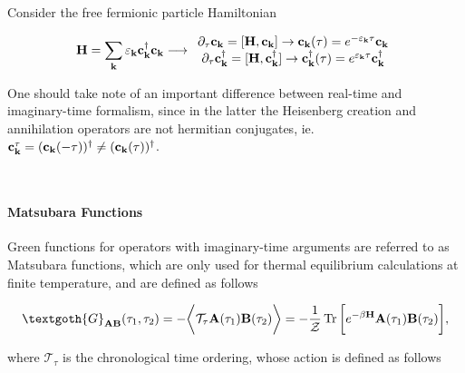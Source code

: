 \begin{tcolorbox}[colback = Bittersweet, title = Example]

Consider the free fermionic particle Hamiltonian

\begin{equation*}
    \begin{split}
        {\bf H} = \sum_{{\bf k}} \varepsilon_{{\bf k}} {\bf c}_{{\bf k}}^\dagger {\bf c}_{{\bf k}} \longrightarrow \begin{array}{cc}
            \partial_{\tau} {\bf c}_{{\bf k}} = [{\bf H}, {\bf c}_{{\bf k}}] \rightarrow {\bf c}_{{\bf k}}(\tau) = e^{-{\varepsilon}_{{\bf k}} \tau} {\bf c}_{{\bf k}} \\
            \partial_{\tau} {\bf c}_{{\bf k}}^\dagger = [{\bf H}, {\bf c}_{{\bf k}}^\dagger] \rightarrow {\bf c}_{{\bf k}}^\dagger(\tau) = e^{{\varepsilon}_{{\bf k}} \tau} {\bf c}_{{\bf k}}^\dagger 
        \end{array}
    \end{split}
\end{equation*}

One should take note of an important difference between real-time and imaginary-time formalism, since in the latter the Heisenberg creation and annihilation operators are not hermitian conjugates, ie. ${\bf c}_{{\bf k}}^\tau = ({\bf c}_{{\bf k}} (-\tau))^\dagger \neq ({\bf c}_{{\bf k}} (\tau))^\dagger$.

\end{tcolorbox}

\blanky \\

\paragraph{Matsubara Functions}

Green functions for operators with imaginary-time arguments are referred to as Matsubara functions, which are only used for thermal equilibrium calculations at finite temperature, and are defined as follows 

\begin{equation}
    \textgoth{G}_{{\bf A} {\bf B}}(\tau_1, \tau_2) = - \bigg \langle \mathcal{T}_{\tau} {\bf A}(\tau_1) {\bf B}(\tau_2) \bigg\rangle = - \frac{1}{\mathcal{Z}} \Tr \bigg[ e^{-\beta {\bf H}} {\bf A}(\tau_1) {\bf B}(\tau_2) \bigg],
\end{equation}

where $\mathcal{T}_\tau$ is the chronological time ordering, whose action is defined as follows

